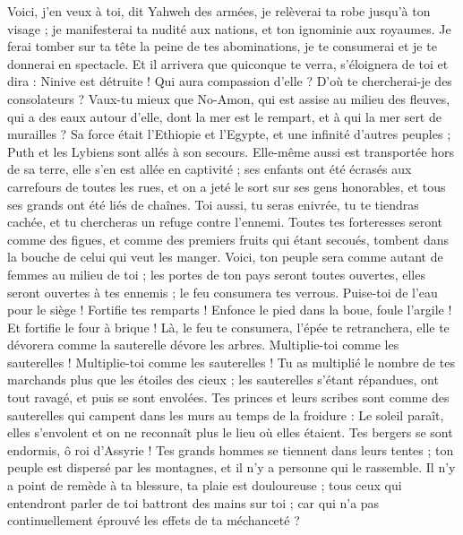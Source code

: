\begin{multicols}{2}
Voici, j'en veux à toi, dit Yahweh des armées, je relèverai ta robe jusqu'à ton visage ; je manifesterai ta nudité aux nations, et ton ignominie aux royaumes.
Je ferai tomber sur ta tête la peine de tes abominations, je te consumerai et je te donnerai en spectacle.
Et il arrivera que quiconque te verra, s'éloignera de toi et dira : Ninive est détruite ! Qui aura compassion d'elle ? D'où te chercherai-je des consolateurs ?
Vaux-tu mieux que No-Amon, qui est assise au milieu des fleuves, qui a des eaux autour d'elle, dont la mer est le rempart, et à qui la mer sert de murailles ?
Sa force était l'Ethiopie et l'Egypte, et une infinité d'autres peuples ; Puth et les Lybiens sont allés à son secours.
Elle-même aussi est transportée hors de sa terre, elle s'en est allée en captivité ; ses enfants ont été écrasés aux carrefours de toutes les rues, et on a jeté le sort sur ses gens honorables, et tous ses grands ont été liés de chaînes.
Toi aussi, tu seras enivrée, tu te tiendras cachée, et tu chercheras un refuge contre l'ennemi.
Toutes tes forteresses seront comme des figues, et comme des premiers fruits qui étant secoués, tombent dans la bouche de celui qui veut les manger.
Voici, ton peuple sera comme autant de femmes au milieu de toi ; les portes de ton pays seront toutes ouvertes, elles seront ouvertes à tes ennemis ; le feu consumera tes verrous.
Puise-toi de l'eau pour le siège ! Fortifie tes remparts ! Enfonce le pied dans la boue, foule l'argile ! Et fortifie le four à brique !
Là, le feu te consumera, l'épée te retranchera, elle te dévorera comme la sauterelle dévore les arbres. Multiplie-toi comme les sauterelles ! Multiplie-toi comme les sauterelles !
Tu as multiplié le nombre de tes marchands plus que les étoiles des cieux ; les sauterelles s'étant répandues, ont tout ravagé, et puis se sont envolées.
Tes princes et leurs scribes sont comme des sauterelles qui campent dans les murs au temps de la froidure : Le soleil paraît, elles s'envolent et on ne reconnaît plus le lieu où elles étaient.
Tes bergers se sont endormis, ô roi d'Assyrie ! Tes grands hommes se tiennent dans leurs tentes ; ton peuple est dispersé par les montagnes, et il n'y a personne qui le rassemble.
Il n'y a point de remède à ta blessure, ta plaie est douloureuse ; tous ceux qui entendront parler de toi battront des mains sur toi ; car qui n'a pas continuellement éprouvé les effets de ta méchanceté ?
\PPE{}
\end{multicols}
